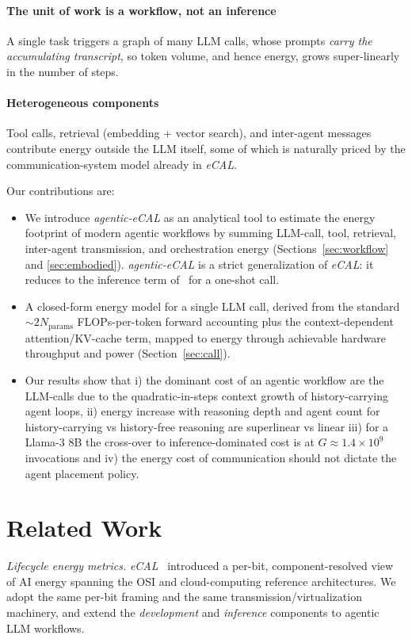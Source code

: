 \documentclass[journal]{IEEEtran}
\newcommand{\crossoverG}{\ensuremath{1.4\times10^{9}}}    %
\newcommand{\agecal}{\textit{agentic-eCAL}}
\newcommand{\ecal}{\textit{eCAL}}
\begin{document}
\paragraph{The unit of work is a workflow, not an inference} A single task triggers a graph of
  many LLM calls, whose prompts \emph{carry the accumulating transcript}, so token volume, and
  hence energy, grows super-linearly in the number of steps.

\paragraph{Heterogeneous components} Tool calls, retrieval (embedding + vector search), and
  inter-agent messages contribute energy outside the LLM itself, some of which is naturally priced
  by the communication-system model already in \ecal{}.

Our contributions are:
\begin{itemize}
\item We introduce \agecal{} as an analytical tool to estimate the energy footprint of modern agentic workflows  by summing LLM-call, tool, retrieval, inter-agent
  transmission, and orchestration energy 
(Sections~\ref{sec:workflow} and \ref{sec:embodied}). \agecal{} is a strict generalization of \ecal{}: it reduces to the inference term of~\cite{chou2026ecal} for a one-shot call.
  
  \item A closed-form energy model for a single LLM call, derived from the standard $\sim\!2N_{\mathrm{params}}$
  FLOPs-per-token forward accounting plus the context-dependent attention/KV-cache term, mapped to
  energy through achievable hardware throughput and power (Section~\ref{sec:call}).
  
  \item Our results show that i) the dominant cost of an  agentic workflow are the LLM-calls due to the quadratic-in-steps context growth of
  history-carrying agent loops, ii) energy increase with reasoning depth and agent count for history-carrying vs history-free reasoning are superlinear vs linear iii) for a Llama-3 8B the cross-over to inference-dominated cost is at $G\approx\crossoverG$ invocations and iv) the energy cost of communication should not dictate the agent placement policy.
\end{itemize}

\section{Related Work}\label{sec:related}
\textit{Lifecycle energy metrics.} \ecal{}~\cite{chou2026ecal} introduced a per-bit,
component-resolved view of AI energy spanning the OSI and cloud-computing reference architectures.
We adopt the same per-bit framing and the same transmission/virtualization machinery, and extend the
\emph{development} and \emph{inference} components to agentic LLM workflows.
\end{document}
